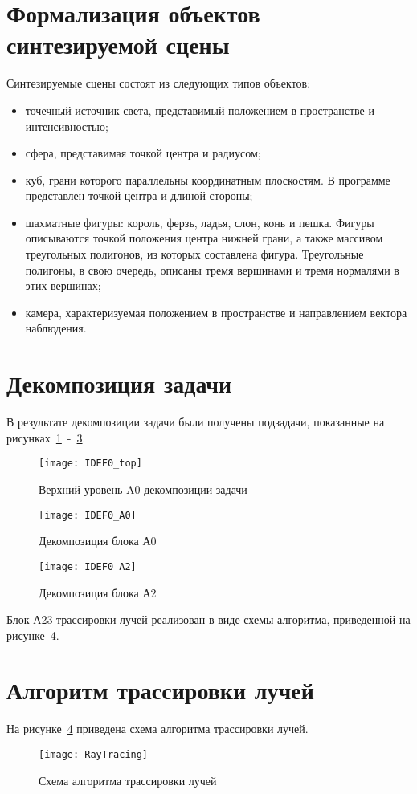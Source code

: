 \section{Формализация объектов синтезируемой сцены}
Синтезируемые сцены состоят из следующих типов объектов:
\begin{itemize}
	\item точечный источник света, представимый положением в пространстве и интенсивностью;
	\item сфера, представимая точкой центра и радиусом;
	\item куб, грани которого параллельны координатным плоскостям. В программе представлен точкой центра и длиной стороны;
	\item шахматные фигуры: король, ферзь, ладья, слон, конь и пешка. Фигуры описываются точкой положения центра нижней грани, а также массивом треугольных полигонов, из которых составлена фигура. Треугольные полигоны, в свою очередь, описаны тремя вершинами и тремя нормалями в этих вершинах;
	\item камера, характеризуемая положением в пространстве и направлением вектора наблюдения.
\end{itemize}


\section{Декомпозиция задачи}
В результате декомпозиции задачи были получены подзадачи, показанные на рисунках~\ref{fig:IDEF0_top}~-~\ref{fig:IDEF0_2}.

\begin{figure}[H]
	\centering
	\texttt{[image: IDEF0\_top]}
	\caption{Верхний уровень A0 декомпозиции задачи}
	\label{fig:IDEF0_top}
\end{figure}

\begin{figure}[H]
	\centering
	\texttt{[image: IDEF0\_A0]}
	\caption{Декомпозиция блока А0}
	\label{fig:IDEF0_1}
\end{figure}

\begin{figure}[H]
	\centering
	\texttt{[image: IDEF0\_A2]}
	\caption{Декомпозиция блока А2}
	\label{fig:IDEF0_2}
\end{figure}

Блок А23 трассировки лучей реализован в виде схемы алгоритма, приведенной на рисунке~\ref{fig:RayTracing}.


\section{Алгоритм трассировки лучей}
На рисунке~\ref{fig:RayTracing} приведена схема алгоритма трассировки лучей.
\begin{figure}[H]
	\centering
	\texttt{[image: RayTracing]}
	\caption{Схема алгоритма трассировки лучей}
	\label{fig:RayTracing}
\end{figure}

